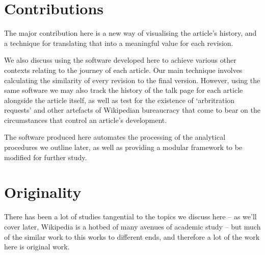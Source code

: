 


\section{Contributions}

The major contribution here is a new way of visualising the article's
history, and a technique for translating that into a meaningful value
for each revision. 

We also discuss using the software developed here to achieve various
other contexts relating to the journey of each article. Our main
technique involves calculating the similarity of every revision to the
final version. However, using the same software we may also track the
history of the talk page for each article alongside the article
itself, as well as test for the existence of `arbritration requests'
and other artefacts of Wikipedian bureaucracy that come to bear on the
circumstances that control an article's development. 

The software produced here automates the processing of the analytical
procedures we outline later, as well as providing a modular framework
to be modified for further study.

\section{Originality}
There has been a lot of studies tangential to the topics we discuss
here -- as we'll cover later, Wikipedia is a hotbed of many avenues of
academic study -- but much of the similar work to this works to
different ends, and therefore a lot of the work here is original work.

